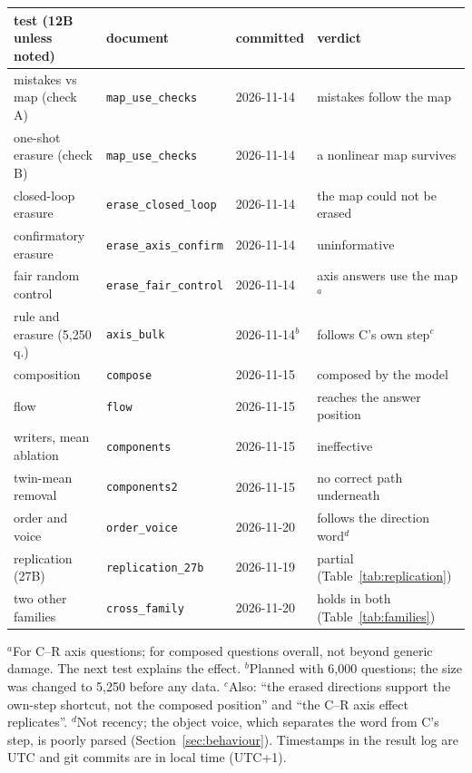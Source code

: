 \documentclass[10pt]{article}
\begin{document}
\begin{center}
\footnotesize
\begin{tabular}{@{}llll@{}}
  \toprule
  test (12B unless noted) & document & committed & verdict \\
  \midrule
  mistakes vs map (check A) & \texttt{map\_use\_checks} & 2026-11-14 & mistakes follow the map \\
  one-shot erasure (check B) & \texttt{map\_use\_checks} & 2026-11-14 & a nonlinear map survives \\
  closed-loop erasure & \texttt{erase\_closed\_loop} & 2026-11-14 & the map could not be erased \\
  confirmatory erasure & \texttt{erase\_axis\_confirm} & 2026-11-14 & uninformative \\
  fair random control & \texttt{erase\_fair\_control} & 2026-11-14 & axis answers use the map$^{a}$ \\
  rule and erasure (5,250 q.) & \texttt{axis\_bulk} & 2026-11-14$^{b}$ & follows C's own step$^{c}$ \\
  composition & \texttt{compose} & 2026-11-15 & composed by the model \\
  flow & \texttt{flow} & 2026-11-15 & reaches the answer position \\
  writers, mean ablation & \texttt{components} & 2026-11-15 & ineffective \\
  twin-mean removal & \texttt{components2} & 2026-11-15 & no correct path underneath \\
  order and voice & \texttt{order\_voice} & 2026-11-20 & follows the direction word$^{d}$ \\
  replication (27B) & \texttt{replication\_27b} & 2026-11-19 & partial (Table~\ref{tab:replication}) \\
  two other families & \texttt{cross\_family} & 2026-11-20 & holds in both (Table~\ref{tab:families}) \\
  \bottomrule
\end{tabular}

\raggedright
$^{a}$For C--R axis questions; for composed questions overall, not beyond generic damage. The next test explains the
effect. $^{b}$Planned with 6,000 questions; the size was changed to 5,250 before any data. $^{c}$Also:
``the erased directions support the own-step shortcut, not the composed position'' and ``the C--R axis effect
replicates''. $^{d}$Not recency; the object voice, which separates the word from C's step, is poorly parsed (Section~\ref{sec:behaviour}). Timestamps in the result log are UTC and git commits are in local time (UTC+1).
\end{center}
\end{document}
